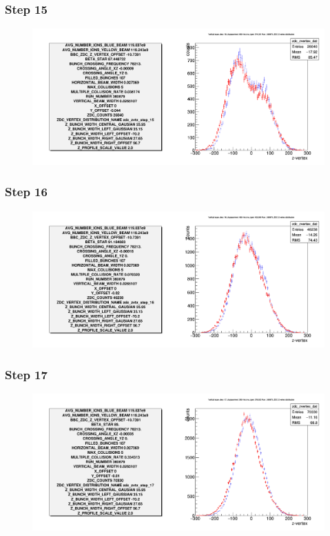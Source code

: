 \begin{frame}
  \frametitle{Step 15}
  \begin{figure}
    \includegraphics[width=\linewidth]{"./figures/tuned_simulation_step_15"}
    \label{fig:step_15}
  \end{figure}
\end{frame}

\begin{frame}
  \frametitle{Step 16}
  \begin{figure}
    \includegraphics[width=\linewidth]{"./figures/tuned_simulation_step_16"}
    \label{fig:step_16}
  \end{figure}
\end{frame}

\begin{frame}
  \frametitle{Step 17}
  \begin{figure}
    \includegraphics[width=\linewidth]{"./figures/tuned_simulation_step_17"}
    \label{fig:step_17}
  \end{figure}
\end{frame}

